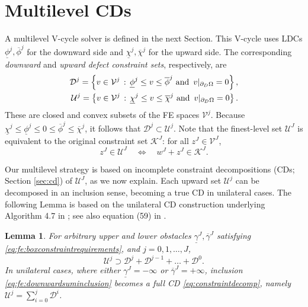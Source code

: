 \documentclass[letterpaper,final,12pt,reqno]{amsart}
\theoremstyle{cstyle}
\newtheorem{lemma}[theorem]{Lemma}
\theoremstyle{cstyle*}
\theoremstyle{dstyle}
\numberwithin{equation}{section}
\numberwithin{figure}{section}
\numberwithin{table}{section}
\numberwithin{theorem}{section}
\begin{document}
\section{Multilevel CDs} \label{sec:cdmultilevel}

A multilevel V-cycle solver is defined in the next Section.  This V-cycle uses LDCs $\underline{\phi}^j,\overline{\phi}^j$ for the downward side and $\underline{\chi}^j,\overline{\chi}^j$ for the upward side.  The corresponding \emph{downward} and \emph{upward defect constraint sets}, respectively, are
\begin{align}
\mathcal{D}^j = \left\{v \in \mathcal{V}^j \,:\, \underline{\phi}^j \le v \le \overline{\phi}^j \text{ and } \, v|_{\partial_D\Omega} = 0\right\}, \label{eq:fe:constraintsets} \\
\mathcal{U}^j = \left\{v \in \mathcal{V}^j \,:\, \underline{\chi}^j \le v \le \overline{\chi}^j \text{ and } \, v|_{\partial_D\Omega} = 0\right\}. \notag
\end{align}
These are closed and convex subsets of the FE spaces $\mathcal{V}^j$.  Because $\underline{\chi}^j \le \underline{\phi}^j \le 0 \le \overline{\phi}^j \le \overline{\chi}^j$, it follows that $\mathcal{D}^j \subset \mathcal{U}^j$.  Note that the finest-level set $\mathcal{U}^J$ is equivalent to the original constraint set $\mathcal{K}^J$: for all $z^J \in \mathcal{V}^J$,
\begin{equation}
z^J \in \mathcal{U}^J \quad \iff \quad w^J+z^J \in \mathcal{K}^J. \label{eq:fe:finestlevelequivalent}
\end{equation}

Our multilevel strategy is based on incomplete constraint decompositions (CDs; Section \ref{sec:cd}) of $\mathcal{U}^J$, as we now explain.  Each upward set $\mathcal{U}^j$ can be decomposed in an inclusion sense, becoming a true CD in unilateral cases.  The following Lemma is based on the unilateral CD construction underlying Algorithm 4.7 in \cite{GraeserKornhuber2009}; see also equation (59) in \cite{Tai2003}.

\begin{lemma}  \label{lem:downwardadmissibility}  For arbitrary upper and lower obstacles $\underline{\gamma}^J,\overline{\gamma}^J$ satisfying \eqref{eq:fe:boxconstraintrequirements}, and $j=0,1,\dots,J$,
\begin{equation}
\mathcal{U}^j \supset \mathcal{D}^j + \mathcal{D}^{j-1} + \dots + \mathcal{D}^0. \label{eq:fe:downwardsuminclusion}
\end{equation}
In unilateral cases, where either $\underline{\gamma}^J=-\infty$ or $\overline{\gamma}^J=+\infty$, inclusion \eqref{eq:fe:downwardsuminclusion} becomes a full CD \eqref{eq:constraintdecomp}, namely $\mathcal{U}^j=\sum_{i=0}^j \mathcal{D}^i$.
\end{lemma}
\end{document}
